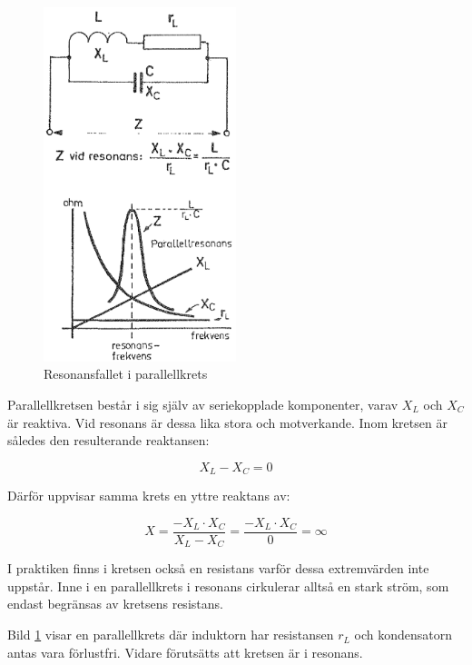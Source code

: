 \begin{figure}[ht]
\begin{center}
  \includegraphics[width=0.5\textwidth]{images/cropped_pdfs/bild_2_3-18.pdf}
  \caption{Resonansfallet i parallellkrets}
  \label{fig:BildII3-18}
\end{center}
\end{figure}

Parallellkretsen består i sig själv av seriekopplade komponenter, varav
\(X_L\) och \(X_C\) är reaktiva.
Vid resonans är dessa lika stora och motverkande.
Inom kretsen är således den resulterande reaktansen:

\[X_L - X_C = 0\]

Därför uppvisar samma krets en yttre reaktans av:

\[
  X = \frac{-X_L \cdot X_C}{X_L - X_C}
  = \frac{-X_L \cdot X_C}{0}
  = \infty
\]

I praktiken finns i kretsen också en resistans varför dessa extremvärden inte
uppstår.
Inne i en parallellkrets i resonans cirkulerar alltså en stark ström,
som endast begränsas av kretsens resistans.

Bild \ref{fig:BildII3-18} visar en parallellkrets där induktorn har resistansen
\(r_L\) och kondensatorn antas vara förlustfri.
Vidare förutsätts att kretsen är i resonans.

